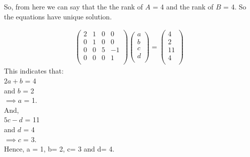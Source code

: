 So, from here we can say that the the rank of $A$ = 4 and the rank of $B$ = 4.
So the equations have unique solution.

\begin{equation}
\begin{aligned}
      \begin{pmatrix}
      2       & 1    & 0   & 0\\ 
      0       & 1   & 0   & 0\\
      0       & 0    & 5   & -1\\ 
      0       & 0   & 0   & 1\\
            
    \end{pmatrix} \begin{pmatrix}
      a\\ 
      b\\
      c\\
      d\\
            
    \end{pmatrix} = \begin{pmatrix}
      4\\ 
      2\\
      11\\
      4\\
            
    \end{pmatrix} 
\end{aligned}
\end{equation}
This indicates that:\\
$2a+b$ = 4\\
and $b$ = 2\\
$\implies  a$ = 1.\\
And, \\
$5c-d$ = 11\\
and $d$ = 4\\
$\implies  c$ = 3.\\
Hence, a = 1, b= 2, c= 3 and d= 4.


